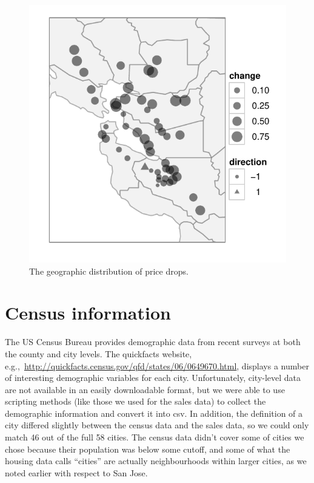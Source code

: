 \documentclass[oneside]{article}
\begin{document}
\begin{figure}[htbp]
  \centering
    \includegraphics[width=0.5\linewidth]{cities-geo-changes}
  \caption{The geographic distribution of price drops.}
  \label{fig:geo}
\end{figure}

\section{Census information}

The US Census Bureau provides demographic data from recent surveys at both the county and city levels. The quickfacts website, e.g.,\ \url{http://quickfacts.census.gov/qfd/states/06/0649670.html}, displays a number of interesting demographic variables for each city. Unfortunately, city-level data are not available in an easily downloadable format, but we were able to use scripting methods (like those we used for the sales data) to collect the demographic information and convert it into csv.  In addition, the definition of a city differed slightly between the census data and the sales data, so we could only match 46 out of the full 58 cities.  The census data didn't cover some of cities we chose because their population was below some cutoff, and some of what the housing data calls ``cities'' are actually neighbourhoods within larger cities, as we noted earlier with respect to San Jose.
\end{document}
